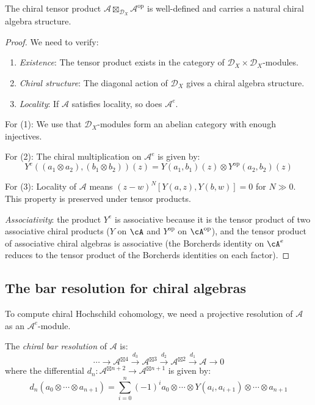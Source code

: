 \begin{lemma}
\label{lem:chiral-enveloping-well-defined}
The chiral tensor product $\mathcal{A} \boxtimes_{\mathcal{D}_X} \mathcal{A}^{\text{op}}$ is well-defined and carries a natural chiral algebra structure.
\end{lemma}

\begin{proof}
We need to verify:
\begin{enumerate}
\item \emph{Existence}: The tensor product exists in the category of $\mathcal{D}_X \times \mathcal{D}_X$-modules.
\item \emph{Chiral structure}: The diagonal action of $\mathcal{D}_X$ gives a chiral algebra structure.
\item \emph{Locality}: If $\mathcal{A}$ satisfies locality, so does $\mathcal{A}^e$.
\end{enumerate}

For (1): We use that $\mathcal{D}_X$-modules form an abelian category with enough injectives.

For (2): The chiral multiplication on $\mathcal{A}^e$ is given by:
\[
Y^e((a_1 \otimes a_2), (b_1 \otimes b_2))(z) = Y(a_1, b_1)(z) \otimes Y^{\text{op}}(a_2, b_2)(z)
\]

For (3): Locality of $\mathcal{A}$ means $(z-w)^N[Y(a,z), Y(b,w)] = 0$ for $N \gg 0$. This property is preserved under tensor products.

\emph{Associativity}: the product $Y^e$ is associative because it
is the tensor product of two associative chiral products ($Y$ on
$\cA$ and $Y^{\mathrm{op}}$ on $\cA^{\mathrm{op}}$), and the
tensor product of associative chiral algebras is associative
(the Borcherds identity on $\cA^e$ reduces to the tensor product
of the Borcherds identities on each factor). \qedhere
\end{proof}

\subsection{The bar resolution for chiral algebras}

To compute chiral Hochschild cohomology, we need a projective resolution of $\mathcal{A}$ as an $\mathcal{A}^e$-module.

\begin{definition}
The \emph{chiral bar resolution} of $\mathcal{A}$ is:
\[
\cdots \to \mathcal{A}^{\boxtimes 4} \xrightarrow{d_3} \mathcal{A}^{\boxtimes 3} \xrightarrow{d_2} \mathcal{A}^{\boxtimes 2} \xrightarrow{d_1} \mathcal{A} \to 0
\]
where the differential $d_n: \mathcal{A}^{\boxtimes n+2} \to \mathcal{A}^{\boxtimes n+1}$ is given by:
\[
d_n(a_0 \otimes \cdots \otimes a_{n+1}) = \sum_{i=0}^n (-1)^i a_0 \otimes \cdots \otimes Y(a_i, a_{i+1}) \otimes \cdots \otimes a_{n+1}
\]
\end{definition}

